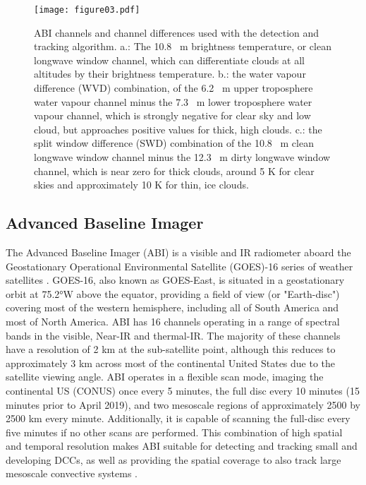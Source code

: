 \begin{figure}[t]
    \texttt{[image: figure03.pdf]}
    \caption{ABI channels and channel differences used with the detection and tracking algorithm. a.: The 10.8 \unit{\mu m} brightness temperature, or clean longwave window channel, which can differentiate clouds at all altitudes by their brightness temperature. b.: the water vapour difference (WVD) combination, of the 6.2 \unit{\mu m} upper troposphere water vapour channel minus the 7.3 \unit{\mu m} lower troposphere water vapour channel, which is strongly negative for clear sky and low cloud, but approaches positive values for thick, high clouds. c.: the split window difference (SWD) combination of the 10.8 \unit{\mu m} clean longwave window channel minus the 12.3 \unit{\mu m} dirty longwave window channel, which is near zero for thick clouds, around 5 \unit{K} for clear skies and approximately 10 \unit{K} for thin, ice clouds.}
    \label{fig:abi_channels}
\end{figure}

\subsection{Advanced Baseline Imager}


The Advanced Baseline Imager (ABI) is a visible and IR radiometer aboard the Geostationary Operational Environmental Satellite (GOES)-16 series of weather satellites \citep{schmit_closer_2016}.
GOES-16, also known as GOES-East, is situated in a geostationary orbit at 75.2°W above the equator, providing a field of view (or "Earth-disc") covering most of the western hemisphere, including all of South America and most of North America.
ABI has 16 channels operating in a range of spectral bands in the visible, Near-IR and thermal-IR.
The majority of these channels have a resolution of 2 \unit{km} at the sub-satellite point, although this reduces to approximately 3 \unit{km} across most of the continental United States due to the satellite viewing angle.
ABI operates in a flexible scan mode, imaging the continental US (CONUS) once every 5 minutes, the full disc every 10 minutes (15 minutes prior to April 2019), and two mesoscale regions of approximately 2500 by 2500 \unit{km} every minute.
Additionally, it is capable of scanning the full-disc every five minutes if no other scans are performed.
This combination of high spatial and temporal resolution makes ABI suitable for detecting and tracking small and developing DCCs, as well as providing the spatial coverage to also track large mesoscale convective systems \citep{heikenfeld_tobac_2019}.

